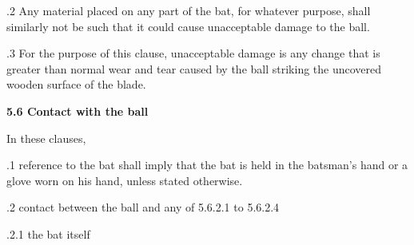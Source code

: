 \documentclass[12pt]{article}
\begin{document}
\vspace{\baselineskip}
\begin{adjustwidth}{0.5in}{0.28in}
{\fontsize{9pt}{10.8pt}.2 \tabto{0.49in} Any material placed on any part of the bat, for whatever purpose, shall similarly not be such that it could cause unacceptable damage to the ball.\par}\par

\end{adjustwidth}


\vspace{\baselineskip}
\begin{adjustwidth}{0.5in}{0.21in}
{\fontsize{9pt}{10.8pt}.3 \tabto{0.49in} For the purpose of this clause, unacceptable damage is any change that is greater than normal wear and tear caused by the ball striking the uncovered wooden surface of the blade.\par}\par

\end{adjustwidth}


\vspace{\baselineskip}
{\fontsize{11pt}{13.2pt}\selectfont \textbf{5.6 \tabto{0.47in} Contact with the ball}\par}\par


\vspace{\baselineskip}
{\fontsize{9pt}{10.8pt}\selectfont In these clauses,\par}\par


\vspace{\baselineskip}
\begin{adjustwidth}{0.5in}{0.38in}
{\fontsize{9pt}{10.8pt}.1 \tabto{0.49in} reference to the bat shall imply that the bat is held in the batsman’s hand or a glove worn on his hand, unless stated otherwise.\par}\par

\end{adjustwidth}


\vspace{\baselineskip}
{\fontsize{9pt}{10.8pt}.2 \tabto{0.49in} contact between the ball and any of 5.6.2.1 to 5.6.2.4\par}\par


\vspace{\baselineskip}
\begin{adjustwidth}{0.49in}{0.0in}
{\fontsize{9pt}{10.8pt}.2.1 \tabto{1.17in} the bat itself\par}\par

\end{adjustwidth}
\end{document}
